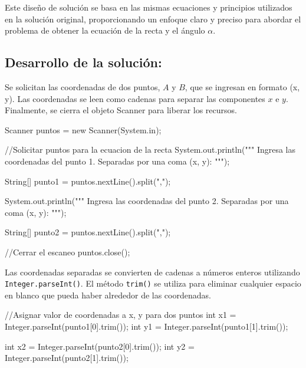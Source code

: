 Este diseño de solución se basa en las mismas ecuaciones y principios utilizados en la solución original, proporcionando un enfoque claro y preciso para abordar el problema de obtener la ecuación de la recta y el ángulo \(\alpha\).
\newpage

\subsection{\textbf{Desarrollo de la solución:}}

Se solicitan las coordenadas de dos puntos, \(A\) y \(B\), que se ingresan en formato (x, y). Las coordenadas se leen como cadenas para separar las componentes \(x\) e \(y\). Finalmente, se cierra el objeto Scanner para liberar los recursos.

    \begin{javaCode}
        Scanner puntos = new Scanner(System.in);
        
        //Solicitar puntos para la ecuacion de la recta
        System.out.println("""
                            Ingresa las coordenadas del punto 1.
                            Separadas por una coma (x, y):
                            """);
        
        String[] punto1 = puntos.nextLine().split(",");
        
        System.out.println("""
                            Ingresa las coordenadas del punto 2.
                            Separadas por una coma (x, y):
                            """);
        
        String[] punto2 = puntos.nextLine().split(",");
        
        //Cerrar el escaneo
        puntos.close();
    \end{javaCode}

Las coordenadas separadas se convierten de cadenas a números enteros utilizando \texttt{Integer.parseInt()}. El método \texttt{trim()} se utiliza para eliminar cualquier espacio en blanco que pueda haber alrededor de las coordenadas.

    \begin{javaCode}
        //Asignar valor de coordenadas a x, y para dos puntos
        int x1 = Integer.parseInt(punto1[0].trim());
        int y1 = Integer.parseInt(punto1[1].trim());
        
        int x2 = Integer.parseInt(punto2[0].trim());
        int y2 = Integer.parseInt(punto2[1].trim());
    \end{javaCode}

